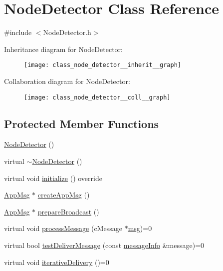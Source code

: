 \hypertarget{class_node_detector}{}\section{Node\+Detector Class Reference}
\label{class_node_detector}


{\ttfamily \#include $<$Node\+Detector.\+h$>$}



Inheritance diagram for Node\+Detector\+:\nopagebreak
\begin{figure}[H]
\begin{center}
\leavevmode
\texttt{[image: class\_node\_detector\_\_inherit\_\_graph]}
\end{center}
\end{figure}


Collaboration diagram for Node\+Detector\+:\nopagebreak
\begin{figure}[H]
\begin{center}
\leavevmode
\texttt{[image: class\_node\_detector\_\_coll\_\_graph]}
\end{center}
\end{figure}
\subsection*{Protected Member Functions}
\begin{DoxyCompactItemize}
\item 
\hyperlink{class_node_detector_a256160d034631f4fa14a83787f504aae}{Node\+Detector} ()
\item 
virtual \hyperlink{class_node_detector_a3f8e6eedfce05ea8953ff1a41413ccfa}{$\sim$\+Node\+Detector} ()
\item 
virtual void \hyperlink{class_node_detector_aefa188ab0657837b1b57f24674d3ef22}{initialize} () override
\item 
\hyperlink{class_app_msg}{App\+Msg} $\ast$ \hyperlink{class_node_detector_a7100349647350ad5e3aeb1ed4669c723}{create\+App\+Msg} ()
\item 
\hyperlink{class_app_msg}{App\+Msg} $\ast$ \hyperlink{class_node_detector_af75cf37cc01fc51bc228a7a83c10cb97}{prepare\+Broadcast} ()
\item 
virtual void \hyperlink{class_node_detector_ab69432c6d3327a684845ec231826727e}{process\+Message} (c\+Message $\ast$\hyperlink{_controller_8h_afa0f3b802fbc219228f7bb97996fa558}{msg})=0
\item 
virtual bool \hyperlink{class_node_detector_a51e7dccd54e94bbe937752ca39dfdba4}{test\+Deliver\+Message} (const \hyperlink{structures_8h_a7e7bdc1d2fff8a9436f2f352b2711ed6}{message\+Info} \&message)=0
\item 
virtual void \hyperlink{class_node_detector_a17ecf9939fce7471f4513b66185743cc}{iterative\+Delivery} ()=0
\end{DoxyCompactItemize}
